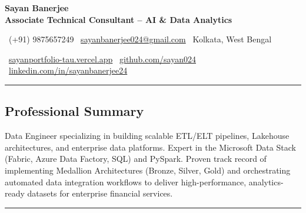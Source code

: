 \documentclass[11pt,letterpaper]{article}
\begin{document}

\begin{center}

{\LARGE \textbf{Sayan Banerjee}}\\
\vspace{0.15cm}
{\large \textbf{Associate Technical Consultant -- AI \& Data Analytics}} \\

\vspace{0.25cm}

{\small
\raisebox{-0.1\height}{\large \faPhone} \ (+91) 9875657249
\quad \textbullet \quad
\raisebox{-0.1\height}{\large \faEnvelope} \ \href{mailto:sayanbanerjee024@gmail.com}{sayanbanerjee024@gmail.com}
\quad \textbullet \quad
\raisebox{-0.1\height}{\large \faMapMarker} \ Kolkata, West Bengal
}

\vspace{0.15cm}

{\small
\raisebox{-0.1\height}{\large \faGlobe} \ \href{https://sayanportfolio-tau.vercel.app/}{sayanportfolio-tau.vercel.app}
\quad \textbullet \quad
\raisebox{-0.1\height}{\large \faGithub} \ \href{https://github.com/sayan024}{github.com/sayan024}
\quad \textbullet \quad
\raisebox{-0.1\height}{\large \faLinkedin} \ \href{https://www.linkedin.com/in/sayanbanerjee24}{linkedin.com/in/sayanbanerjee24}
}

\end{center}

\hrule
\vspace{-0.8em}


\subsection*{\Large Professional Summary}

Data Engineer specializing in building scalable ETL/ELT pipelines, Lakehouse architectures, and enterprise data platforms. Expert in the Microsoft Data Stack (Fabric, Azure Data Factory, SQL) and PySpark. Proven track record of implementing Medallion Architectures (Bronze, Silver, Gold) and orchestrating automated data integration workflows to deliver high-performance, analytics-ready datasets for enterprise financial services.

\vspace{0.6em}

\hrule
\vspace{-0.8em}
\end{document}
